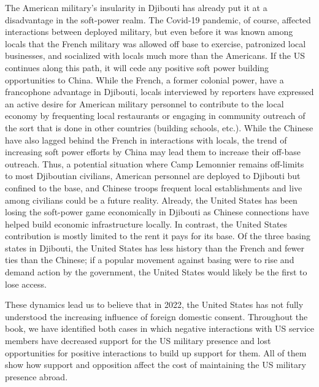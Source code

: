 The American military's insularity in Djibouti has already put it at a disadvantage in the soft-power realm. The Covid-19 pandemic, of course, affected interactions between deployed military, but even before it was known among locals that the French military was allowed off base to exercise, patronized local businesses, and socialized with locals much more than the Americans. If the US continues along this path, it will cede any positive soft power building opportunities to China. While the French, a former colonial power, have a francophone advantage in Djibouti, locals interviewed by reporters have expressed an active desire for American military personnel to contribute to the local economy by frequenting local restaurants or engaging in community outreach of the sort that is done in other countries (building schools, etc.).\cite{Jacobs2017} While the Chinese have also lagged behind the French in interactions with locals, the trend of increasing soft power efforts by China may lead them to increase their off-base outreach. Thus, a potential situation where Camp Lemonnier remains off-limits to most Djiboutian civilians, American personnel are deployed to Djibouti but confined to the base, and Chinese troops frequent local establishments and live among civilians could be a future reality.  Already, the United States has been losing the soft-power game economically in Djibouti as Chinese connections have helped build economic infrastructure locally. In contrast, the United States contribution is mostly limited to the rent it pays for its base.\cite{Bearak2019} Of the three basing states in Djibouti, the United States has less history than the French and fewer ties than the Chinese; if a popular movement against basing were to rise and demand action by the government, the United States would likely be the first to lose access.

These dynamics lead us to believe that in 2022, the United States has not fully understood the increasing influence of foreign domestic consent. Throughout the book, we have identified both cases in which negative interactions with US service members have decreased support for the US military presence and lost opportunities for positive interactions to build up support for them. All of them show how support and opposition affect the cost of maintaining the US military presence abroad.  

